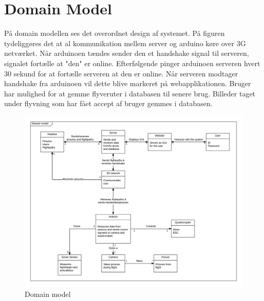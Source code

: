 \section{Domain Model}

På domain modellen ses det overordnet design af systemet. På figuren tydeliggøres det at al kommunikation mellem server og arduino køre over 3G netværket. Når arduinoen tændes sender den et handshake signal til serveren, signalet fortælle at "den" er online. Efterfølgende pinger arduinoen serveren hvert 30 sekund for at fortælle serveren at den er online. Når serveren modtager handshake fra arduinoen vil dette blive markeret på webapplikationen. Bruger har mulighed for at gemme flyveruter i databasen til senere brug. Billeder taget under flyvning som har fået accept af bruger gemmes i databasen.

\vspace{-5pt}
\begin{figure}[H]
	\centering
	\includegraphics[width=1.\textwidth]{Billeder/domain_model.png}
	\vspace{-5pt}
	\caption{Domain model}
	\label{fig:domain_model}
\end{figure}
